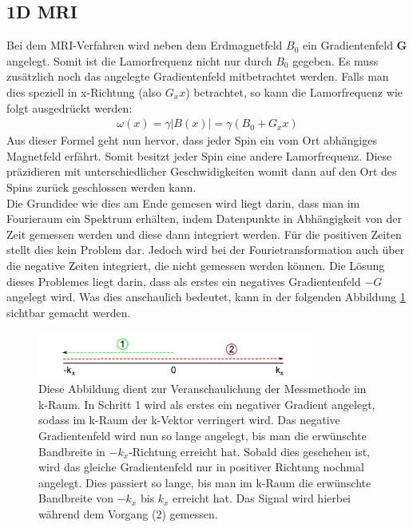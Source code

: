 \subsection{1D MRI}\label{sec:1DMRIkapitel}
Bei dem MRI-Verfahren wird neben dem Erdmagnetfeld $B_0$ ein Gradientenfeld \textbf{G} angelegt. Somit ist die Lamorfrequenz nicht nur durch $B_0$ gegeben. Es muss zusätzlich noch das angelegte Gradientenfeld mitbetrachtet werden. Falls man dies speziell in x-Richtung (also $G_xx$) betrachtet, so kann die Lamorfrequenz wie folgt ausgedrückt werden:
\begin{align}
    \omega(x)=\gamma |B(x)|= \gamma \left(B_0+G_xx\right)
\end{align} \label{eq:gradientlamor}
Aus dieser Formel geht nun hervor, dass jeder Spin ein vom Ort abhängiges Magnetfeld erfährt. Somit besitzt jeder Spin eine andere Lamorfrequenz. Diese präzidieren mit unterschiedlicher Geschwidigkeiten womit dann auf den Ort des Spins zurück geschlossen werden kann. \\

Die Grundidee wie dies am Ende gemesen wird liegt darin, dass man im Fourieraum ein Spektrum erhälten, indem Datenpunkte in Abhängigkeit von der Zeit gemessen werden und diese dann integriert werden. Für die positiven Zeiten stellt dies kein Problem dar. Jedoch wird bei der Fourietransformation auch über die negative Zeiten integriert, die nicht gemessen werden können. Die Lösung dieses Problemes liegt darin, dass als erstes ein negatives Gradientenfeld $-G$ angelegt wird. Was dies anschaulich bedeutet, kann in der folgenden Abbildung \ref{fig:1DMRI} sichtbar gemacht werden.  
\begin{figure}[H]
    \centering
    \includegraphics[width=0.8\textwidth]{Abbildungen/1DMRIkraum.JPG}
    \caption{Diese Abbildung dient zur Veranschaulichung der Messmethode im k-Raum. In Schritt 1 wird als erstes ein negativer Gradient angelegt, sodass im k-Raum der k-Vektor verringert wird. Das negative Gradientenfeld wird nun so lange angelegt, bis man die erwünschte Bandbreite in $-k_{x}$-Richtung erreicht hat. Sobald dies geschehen ist, wird das gleiche Gradientenfeld nur in positiver Richtung nochmal angelegt. Dies passiert so lange,  bis man im k-Raum die erwünschte Bandbreite von $-k_{x}$ bis $k_{x}$ erreicht hat. Das Signal wird hierbei während dem Vorgang (2) gemessen.\cite{Schmidt}}\label{fig:1DMRI}
\end{figure}

